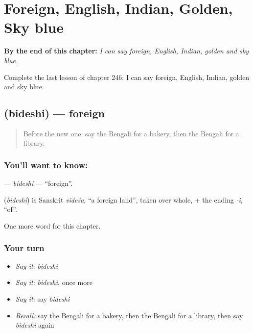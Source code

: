 
\chapter{Foreign, English, Indian, Golden, Sky blue}
\label{ch:bn-foreign-english-indian-golden-sky-blue}

\begin{chapteropening}
\textbf{By the end of this chapter:} \emph{I can say foreign, English, Indian, golden and sky blue.}

Complete the last lesson of chapter 246: I can say foreign, English, Indian, golden and sky blue.
\end{chapteropening}

\section[\texorpdfstring{\bn{বিদেশি} (bideshi)}{বিদেশি (bideshi)}]{ (bideshi) — foreign}

\label{lesson:BN-C246-bideshi}



\begin{quote}
Before the new one: say the Bengali for a bakery, then the Bengali for a library.
\end{quote}

\subsection*{You'll want to know: }
\textbf{} — \emph{bideshi} — \textquotedblleft{}foreign\textquotedblright{}.

\begin{cousinweb}
\textbf{} (\emph{bideshi}) is Sanskrit \emph{videśa}, \textquotedblleft{}a foreign land\textquotedblright{}, taken over whole, + the ending \emph{-i}, \textquotedblleft{}of\textquotedblright{}.
\end{cousinweb}

\begin{grammarlens}[title={What you've built}]
One more word for this chapter.
\end{grammarlens}

\subsection*{Your turn}
\begin{itemize}
\raggedright
  \item \emph{Say it:} \emph{bideshi}
  \item \emph{Say it:} \emph{bideshi}, once more
  \item \emph{Say it:} say \emph{bideshi}
  \item \emph{Recall:} say the Bengali for a bakery, then the Bengali for a library, then say \emph{bideshi} again
\end{itemize}

